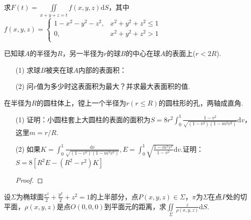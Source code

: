 \begin{xiti}
	\item 求$F(t)=\iint\limits_{x+y+z=t} f(x, y, z) \mathrm{d} S$，其中$f\left(x,y,z\right)=\left\{\begin{matrix}
	1-x^2-y^2-z^2,&x^2+y^2+z^2\le 1\\
	0,&		x^2+y^2+z^2>1\\
	\end{matrix}\right. $
	\begin{solution}
	\end{solution}
	
	\item 已知球$A$的半径为$R$，另一半径为$r$的球$B$的中心在球$A$的表面上($r<2R$).
	\begin{enumerate}
		\item [(1)]求球$B$被夹在球$A$内部的表面积：
		\begin{solution}
		\end{solution}
		
		\item [(2)]问$r$值为多少时这表面积为最大？并求最大表面积的值.
		\begin{solution}
		\end{solution}
		
	\end{enumerate}	
	\item 在半径为$R$的圆柱体上，镗上一个半径为$r(r\leq R)$的圆柱形的孔，两轴成直角.
	\begin{enumerate}
		\item [(1)]证明：小圆柱套上大圆柱的表面的面积为$S=8 r^{2} \int_{0}^{1} \frac{1-v^{2}}{\sqrt{\left(1-v^{2}\right)\left(1-m^{2} v^{2}\right)}} \mathrm{d} v$，这里$m=r/R$.
		\begin{solution}
		\end{solution}
		
		\item [(2)]如果$K=\int_{0}^{1} \frac{\mathrm{d} v}{\sqrt{\left(1-v^{2}\right)\left(1-m^{2} v^{2}\right)}},  E=\int_{0}^{1} \sqrt{\frac{1-m^{2} v^{2}}{1-v^{2}}} \mathrm{d} v$.证明：$S=8\left[R^{2} E-\left(R^{2}-r^{2}\right) K\right]$
		\begin{proof}
		\end{proof}
		
	\end{enumerate}
	
		
	\item 	设$\Sigma$为椭球面$\frac{x^{2}}{2}+\frac{y^{2}}{2}+z^{2}=1$的上半部分，点$P(x, y, z) \in \Sigma$，$\pi $为$\Sigma$在点$P$处的切平面，$\rho(x, y, z)$是点$O(0,0,0)$到平面元的距离，求$\iint\limits_{\Sigma} \frac{z}{\rho(x, y, z)} \mathrm{d} S$.
	\begin{solution}
	\end{solution}
	

\end{xiti}
